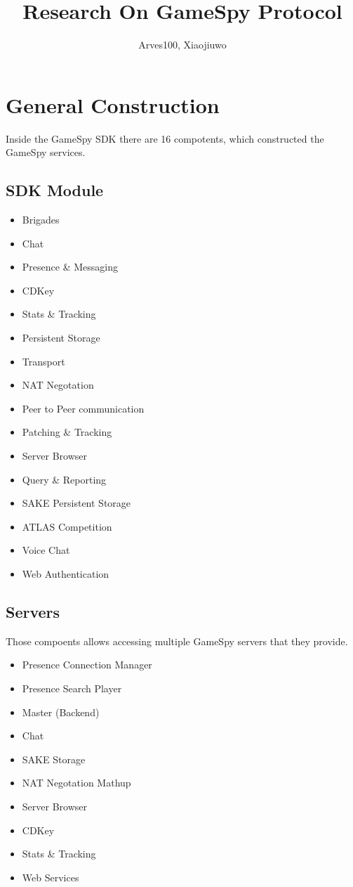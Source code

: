 \documentclass[oneside,titlepage,a4paper]{Definition/retrospy} %
\begin{document}
\title{\Huge\textbf{Research On GameSpy Protocol}} 
\author{Arves100, Xiaojiuwo}



\maketitle  %

\tableofcontents  %


\chapter{General Construction}
\par Inside the GameSpy SDK there are 16 compotents, which constructed the GameSpy services.
\section{SDK Module}
	\begin{itemize}
		\item Brigades
		\item Chat
		\item Presence \& Messaging
		\item CDKey
		\item Stats \& Tracking
		\item Persistent Storage
		\item Transport
		\item NAT Negotation
		\item Peer to Peer communication
		\item Patching \& Tracking
		\item Server Browser
		\item Query \& Reporting
		\item SAKE Persistent Storage
		\item ATLAS Competition
		\item Voice Chat
		\item Web Authentication
	\end{itemize}

\section{Servers}
\par Those compoents allows accessing multiple GameSpy servers that they provide.
	\begin{itemize}
		\item Presence Connection Manager
		\item Presence Search Player
		\item Master (Backend)
		\item Chat
		\item SAKE Storage
		\item NAT Negotation Mathup
		\item Server Browser
		\item CDKey
		\item Stats \& Tracking
		\item Web Services
	\end{itemize}
\end{document}
